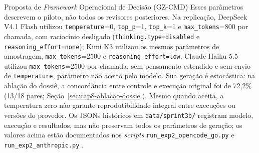 \begin{chapter}{Proposta de \textit{Framework} Operacional de Decisão (GZ-CMD)}
Esses parâmetros descrevem o piloto, não todos os revisores posteriores. Na replicação, DeepSeek V4.1 Flash utilizou \texttt{temperature}=0, \texttt{top\_p}=1, \texttt{top\_k}=1 e \texttt{max\_tokens}=800 por chamada, com raciocínio desligado (\texttt{thinking.type=disabled} e \texttt{reasoning\_effort=none}); Kimi K3 utilizou os mesmos parâmetros de amostragem, \texttt{max\_tokens}=2500 e \texttt{reasoning\_effort=low}. Claude Haiku 5.5 utilizou \texttt{max\_tokens}=2500 por chamada, sem pensamento estendido e sem envio de \texttt{temperature}, parâmetro não aceito pelo modelo. Sua geração é estocástica: na ablação do dossiê, a concordância entre controle e execução original foi de 72,2\% (13/18 pares; Seção~\ref{sec:cap8-ablacao-dossie}). Mesmo quando aceita, a temperatura zero não garante reprodutibilidade integral entre execuções ou versões do provedor. Os JSONs históricos em \texttt{data/sprint3b/} registram modelo, execução e resultados, mas não preservam todos os parâmetros de geração; os valores acima estão documentados nos \textit{scripts} \texttt{run\_exp2\_opencode\_go.py} e \texttt{run\_exp2\_anthropic.py} \cite{Jardim2026phdrepo}.

\begin{table}[!ht]
\centering
\caption{Avaliação comparativa de modelos para revisão assistida ($n=517$ pares do lote selecionado pelo motor; intervalos de Wilson, 95\%).}
\label{tab:cap8-llm-piloto}
\end{table}


\end{chapter}
